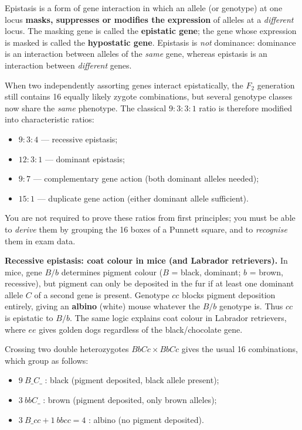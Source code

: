 \documentclass[11pt]{article}
\newcommand{\cle}[1]{{\popxbold\color{popdark}#1}}
\begin{document}
\begin{definition}[Epistasis]
\cle{Epistasis} is a form of gene interaction in which an allele (or genotype) at one locus \textbf{masks, suppresses or modifies the expression} of alleles at a \emph{different} locus. The masking gene is called the \textbf{epistatic gene}; the gene whose expression is masked is called the \textbf{hypostatic gene}. Epistasis is \emph{not} dominance: dominance is an interaction between alleles of the \emph{same} gene, whereas epistasis is an interaction between \emph{different} genes.
\end{definition}

\begin{propriete}
When two independently assorting genes interact epistatically, the $F_2$ generation still contains 16 equally likely zygote combinations, but several genotype classes now share the \emph{same} phenotype. The classical $9:3:3:1$ ratio is therefore modified into characteristic ratios:
\begin{itemize}
\item $9:3:4$ — recessive epistasis;
\item $12:3:1$ — dominant epistasis;
\item $9:7$ — complementary gene action (both dominant alleles needed);
\item $15:1$ — duplicate gene action (either dominant allele sufficient).
\end{itemize}
You are not required to prove these ratios from first principles; you must be able to \emph{derive} them by grouping the 16 boxes of a Punnett square, and to \emph{recognise} them in exam data.
\end{propriete}

\textbf{Recessive epistasis: coat colour in mice (and Labrador retrievers).} In mice, gene $B/b$ determines pigment colour ($B$ = black, dominant; $b$ = brown, recessive), but pigment can only be deposited in the fur if at least one dominant allele $C$ of a second gene is present. Genotype $cc$ blocks pigment deposition entirely, giving an \textbf{albino} (white) mouse whatever the $B/b$ genotype is. Thus $cc$ is epistatic to $B/b$. The same logic explains coat colour in Labrador retrievers, where $ee$ gives golden dogs regardless of the black/chocolate gene.

Crossing two double heterozygotes $BbCc \times BbCc$ gives the usual 16 combinations, which group as follows:

\begin{itemize}
\item $9\ B\_C\_$ : black (pigment deposited, black allele present);
\item $3\ bbC\_$ : brown (pigment deposited, only brown alleles);
\item $3\ B\_cc + 1\ bbcc = 4$ : albino (no pigment deposited).
\end{itemize}
\end{document}
